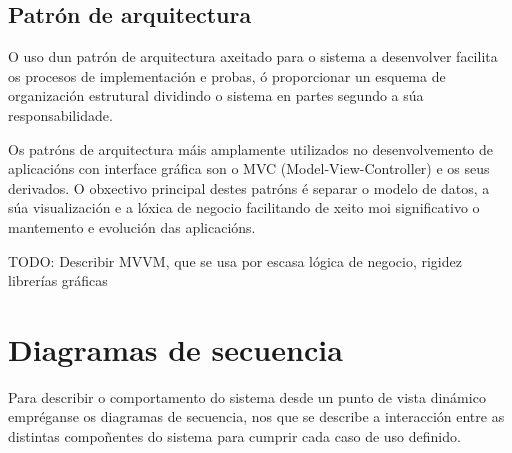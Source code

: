 \subsection{Patrón de arquitectura}
O uso dun patrón de arquitectura axeitado para o sistema a desenvolver facilita os procesos de implementación e probas, ó proporcionar un esquema de organización estrutural dividindo o sistema en partes segundo a súa responsabilidade.

Os patróns de arquitectura máis amplamente utilizados no desenvolvemento de aplicacións con interface gráfica son o MVC (Model-View-Controller) e os seus derivados. O obxectivo principal destes patróns é separar o modelo de datos, a súa visualización e a lóxica de negocio facilitando de xeito moi significativo o mantemento e evolución das aplicacións.

TODO: Describir MVVM, que se usa por escasa lógica de negocio, rigidez librerías gráficas

%

\section{Diagramas de secuencia}
Para describir o comportamento do sistema desde un punto de vista dinámico empréganse os diagramas de secuencia, nos que se describe a interacción entre as distintas compoñentes do sistema para cumprir cada caso de uso definido.


